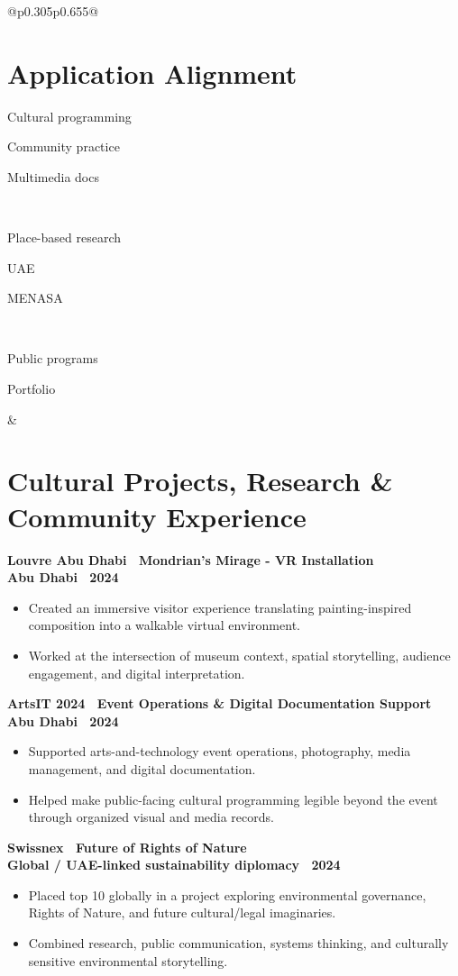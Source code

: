 \documentclass[letterpaper,10pt]{article}
\newcommand{\entrytitle}[1]{\textbf{\color{text}#1}}
\newcommand{\entrymeta}[1]{{\footnotesize\textcolor{muted}{\textbf{#1}}}}
\newcommand{\tagitem}[1]{\colorbox{tagbg}{\footnotesize\textcolor{text}{\strut\hspace{5pt}#1\hspace{5pt}}}}
\newcommand{\rightcoltext}{\fontsize{8.55}{10.25}\selectfont\color{text}}
\begin{document}
{\begin{tabular}{@{}p{0.305\textwidth}p{0.655\textwidth}@{}}
\begin{minipage}[t]{\linewidth}
  \section{Application Alignment}
  \tagitem{Cultural programming}\hspace{4pt}\tagitem{Community practice}\hspace{4pt}\tagitem{Multimedia docs}\\[4pt]
  \tagitem{Place-based research}\hspace{4pt}\tagitem{UAE}\hspace{4pt}\tagitem{MENASA}\\[4pt]
  \tagitem{Public programs}\hspace{4pt}\tagitem{Portfolio}
  \end{minipage}

  &

  \begin{minipage}[t]{\linewidth}
  \rightcoltext
  \section{Cultural Projects, Research \& Community Experience}

  \entrytitle{Louvre Abu Dhabi \textbar\ Mondrian's Mirage - VR Installation}\\
  \entrymeta{Abu Dhabi \textbar\ 2024}
  \begin{itemize}
    \item Created an immersive visitor experience translating painting-inspired composition into a walkable virtual environment.
    \item Worked at the intersection of museum context, spatial storytelling, audience engagement, and digital interpretation.
  \end{itemize}

  \entrytitle{ArtsIT 2024 \textbar\ Event Operations \& Digital Documentation Support}\\
  \entrymeta{Abu Dhabi \textbar\ 2024}
  \begin{itemize}
    \item Supported arts-and-technology event operations, photography, media management, and digital documentation.
    \item Helped make public-facing cultural programming legible beyond the event through organized visual and media records.
  \end{itemize}

  \entrytitle{Swissnex \textbar\ Future of Rights of Nature}\\
  \entrymeta{Global / UAE-linked sustainability diplomacy \textbar\ 2024}
  \begin{itemize}
    \item Placed top 10 globally in a project exploring environmental governance, Rights of Nature, and future cultural/legal imaginaries.
    \item Combined research, public communication, systems thinking, and culturally sensitive environmental storytelling.
  \end{itemize}


\end{minipage}
\end{tabular}}
\end{document}
